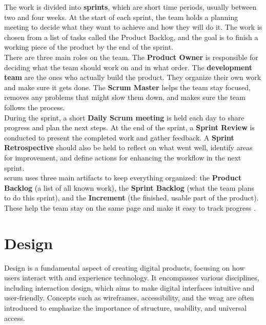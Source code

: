 {The work is divided into \textbf{sprints}, which are short time periods, usually between two and four weeks. At the start of each sprint, the team holds a planning meeting to decide what they want to achieve and how they will do it. The work is chosen from a list of tasks called the Product Backlog, and the goal is to finish a working piece of the product by the end of the sprint. \\

There are three main roles on the team. The \textbf{Product Owner} is responsible for deciding what the team should work on and in what order. The \textbf{development team} are the ones who actually build the product. They organize their own work and make sure it gets done. The \textbf{Scrum Master} helps the team stay focused, removes any problems that might slow them down, and makes sure the team follows the process.\\

During the sprint, a short \textbf{Daily Scrum meeting} is held each day to share progress and plan the next steps. At the end of the sprint, a \textbf{Sprint Review} is conducted to present the completed work and gather feedback. A \textbf{Sprint Retrospective} should also be held to reflect on what went well, identify areas for improvement, and define actions for enhancing the workflow in the next sprint.\\

\gls{scrum} uses three main artifacts to keep everything organized: the \textbf{Product Backlog} (a list of all known work), the \textbf{Sprint Backlog} (what the team plans to do this sprint), and the \textbf{Increment} (the finished, usable part of the product). These help the team stay on the same page and make it easy to track progress \cite{scrumguides:scrum}.

\section{Design}
\label{sec:design}

Design is a fundamental aspect of creating digital products, focusing on how users interact with and experience technology. It encompasses various disciplines, including interaction design, which aims to make digital interfaces intuitive and user-friendly. Concepts such as wireframes, accessibility, and the \gls{wcag} are often introduced to emphasize the importance of structure, usability, and universal access. \\

}
